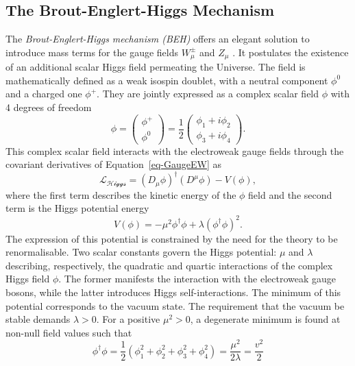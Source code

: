 \subsection{The Brout-Englert-Higgs Mechanism}
The \textit{Brout-Englert-Higgs mechanism (BEH)} offers an elegant solution to introduce mass terms for the gauge fields $W_{\mu}^{\pm}$ and $Z_{\mu}$ \cite{Englert:1964et,  PhysRevLett.13.508}. It postulates the existence of an additional scalar Higgs field permeating the Universe. The field is mathematically defined as a weak isospin doublet, with a neutral component $\phi^0$ and a charged one $\phi^+$. They are jointly expressed as a complex scalar field $\phi$ with 4 degrees of freedom
\begin{equation}
\phi = \begin{pmatrix}
    \phi^+\\ 
    \phi^0
\end{pmatrix} = \frac{1}{2} \begin{pmatrix}
    \phi_1 + i\phi_2 \\ 
    \phi_3 + i\phi_4
\end{pmatrix}.
\end{equation}
This complex scalar field interacts with the electroweak gauge fields through the covariant derivatives of Equation~\ref{eq-GaugeEW} as 
\begin{equation}\label{eq-HiggsLag}
    \mathcal{L_{\text{Higgs}}} = (D_{\mu}\phi)^{\dagger} (D^{\mu}\phi) - V(\phi),
 \end{equation}
where the first term describes the kinetic energy of the $\phi$ field and the second term is the Higgs potential energy
\begin{equation}\label{eq-HiggsPot}
 V(\phi) = - \mu^2  \phi^{\dagger} \phi + \lambda (\phi^{\dagger} \phi)^2.
\end{equation}
The expression of this potential is constrained by the need for the theory to be renormalisable. Two scalar constants govern the Higgs potential: $\mu$ and $\lambda$ describing, respectively, the quadratic and quartic interactions of the complex Higgs field $\phi$. The former manifests the interaction with the electroweak gauge bosons, while the latter introduces Higgs self-interactions. The minimum of this potential corresponds to the vacuum state. The requirement that the vacuum be stable demands $\lambda > 0$. For a positive $\mu^2 > 0$, a degenerate minimum is found at non-null field values such that
\begin{equation}\label{eq-HiggsVacEq}
    \phi^{\dagger} \phi  = \frac{1}{2} (\phi_1^2 + \phi_2^2 + \phi_3^2 + \phi_4^2) = \frac{\mu^2}{2\lambda} = \frac{v^2}{2}
\end{equation}
